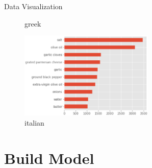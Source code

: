 \documentclass[
 size=14pt,
 paper=smartboard,  %
 mode=present, 		%
 display=slides, 	%
 style=tuliplab,  	%
 pauseslide,
 fleqn,leqno]{powerdot}
\begin{document}
\begin{slide}{Data  Visualization}
\begin{center}
{\begin{figure}
\begin{minipage}[t]{0.45\textwidth}
        \caption{greek}
        \end{minipage}
        \begin{minipage}[t]{0.45\textwidth}
        \centering
        \includegraphics[width=0.57\textwidth]{pic01/italian.eps}
        \caption{italian}
        \end{minipage}
      \end{figure}   
        
    }
    \end{center}
  
    \bigskip
    \begin{center}
    
    \end{center}
  \bigskip

\end{slide}
\section{Build Model}
\end{document}
